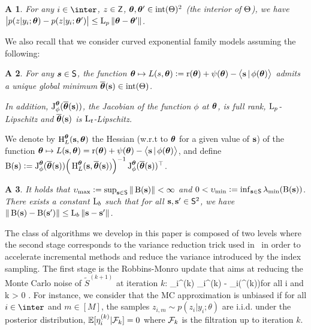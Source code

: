\documentclass[conference,letterpaper]{IEEEtran}
\newtheorem{assumption}{A\!\!}
\begin{document}
\begin{assumption}\label{ass:expected}
For any $i \in \inter$, $z \in \mathsf{Z}$, ${\bm{\theta}}, {\bm{\theta}}' \in {\rm int} (\Theta)^2$ (the interior of $\Theta$), we have $\big| p( z | y_i; {\bm{\theta}} ) - p( z | y_i; {\bm{\theta}}' ) \big| \leq  \operatorname{L}_{p} \| {\bm{\theta}} - {\bm{\theta}}' \|$.
\end{assumption}
We also recall that we consider curved exponential family models assuming the following:
\begin{assumption} \label{ass:reg}
For any $\bm{s} \in \mathsf{S}$, the function ${\bm{\theta}} \mapsto L(s,{\bm{\theta}}) \mathrel{\mathop:}= \operatorname{r}( {\bm{\theta}} ) + \psi( {\bm{\theta}}) - \big\langle {\mathbf{s}}\,|\, \phi ( {\bm{\theta}})  \big\rangle$ admits a unique global minimum $\overline{{\bm{\theta}}}({{\mathbf{s}}}) \in {\rm int}(\Theta)$.

In addition, $\operatorname{J}_{\phi}^{{\bm{\theta}}}(\overline{{\bm{\theta}}}({\mathbf{s}} ))$, the Jacobian of the function $\phi$ at ${\bm{\theta}}$, is full rank, $\operatorname{L}_{p}$-Lipschitz and $\overline{{\bm{\theta}}}( {\mathbf{s}} )$ is $\operatorname{L}_{t}$-Lipschitz.
\end{assumption}
We denote by $\operatorname{H}_{L}^{{\bm{\theta}}}({\mathbf{s}},{\bm{\theta}})$ the Hessian (w.r.t to ${\bm{\theta}}$ for a given value of ${\mathbf{s}}$) of the function ${\bm{\theta}} \mapsto L({\mathbf{s}},{\bm{\theta}})= \operatorname{r}({\bm{\theta}}) + \psi({\bm{\theta}}) -\big\langle{\mathbf{s}}\,|\,\phi({\bm{\theta}}) \big\rangle$, and define $\operatorname{B}( {\mathbf{s}} ) \mathrel{\mathop:}=\operatorname{J}_{ \phi }^{ {\bm{\theta}} }( \overline{{\bm{\theta}}}({{\mathbf{s}}}) ) \Big( \operatorname{H}_{L}^{{\bm{\theta}}}( {{\mathbf{s}}},  \overline{{\bm{\theta}}}({{\mathbf{s}}}) )  \Big)^{-1} \operatorname{J}_{ \phi }^{ {\bm{\theta}} }( \overline{{\bm{\theta}}}({{\mathbf{s}}}) )^\top$.
\begin{assumption}\label{ass:eigen}
It holds that $ \upsilon_{\max} \mathrel{\mathop:}= \sup_{{\mathbf{s}} \in \mathsf{S}} \| \operatorname{B}( {\mathbf{s}} ) \| < \infty$ and $0 < \upsilon_{\min}  \mathrel{\mathop:}= \inf_{{\mathbf{s}} \in \mathsf{S}} \lambda_{\rm min} ( \operatorname{B}( {\mathbf{s}} ) )$.
There exists a constant $\operatorname{L}_{b}$ such that for all ${\mathbf{s}}, {\mathbf{s}}' \in \mathsf{S}^2$, we have $ \| \operatorname{B}( {\mathbf{s}} ) - \operatorname{B}( {\mathbf{s}}' )  \| \leq \operatorname{L}_{b} \| {{\mathbf{s}}} - {{\mathbf{s}}}' \|$.
\end{assumption}
The class of algorithms we develop in this paper is composed of two levels where the second stage corresponds to the variance reduction trick used in~\cite{karimi2019global} in order to accelerate incremental methods and reduce the variance introduced by the index sampling. 
The first stage is the Robbins-Monro update that aims at reducing the Monte Carlo noise of $\tilde{S}^{(k+1)}$ at iteration $k$:
\beq\label{eq:mcerror}
\eta_{i}^{(k)} \eqdef {}_{i}^{(k)} -  \overline{\bss}_i(\vartheta^{(k)})\quad  \textrm{for all} \quad  i \in \inter \quad \textrm{and} \quad  k > 0 \eqs.
\eeq
For instance, we consider that the MC approximation is unbiased if for all $ i \in \inter$ and $m \in [M]$, the samples $z_{i,m} \sim p(z_i|y_i;\theta)$ are i.i.d. under the posterior distribution, \ie $\EE[\eta_{i}^{(k)}|{\cal F}_k] = 0$ where  ${\cal F}_k$ is the filtration up to iteration $k$.
\end{document}
